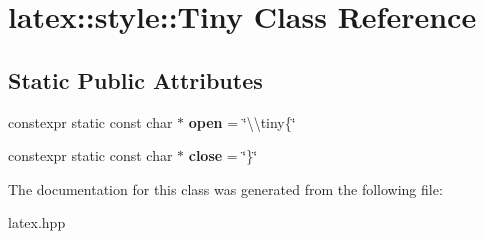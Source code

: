 \hypertarget{classlatex_1_1style_1_1Tiny}{\section{latex\-:\-:style\-:\-:Tiny Class Reference}
\label{classlatex_1_1style_1_1Tiny}
}
\subsection*{Static Public Attributes}
\begin{DoxyCompactItemize}
\item 
\hypertarget{classlatex_1_1style_1_1Tiny_a481c1c48ea808719f2b7386b9f9b2d1b}{constexpr static const char $\ast$ {\bfseries open} = \char`\"{}\textbackslash{}\textbackslash{}tiny\{\char`\"{}}\label{classlatex_1_1style_1_1Tiny_a481c1c48ea808719f2b7386b9f9b2d1b}

\item 
\hypertarget{classlatex_1_1style_1_1Tiny_a66ff1e8ca71e6c41a5d614765ffa52f2}{constexpr static const char $\ast$ {\bfseries close} = \char`\"{}\}\char`\"{}}\label{classlatex_1_1style_1_1Tiny_a66ff1e8ca71e6c41a5d614765ffa52f2}

\end{DoxyCompactItemize}


The documentation for this class was generated from the following file\-:\begin{DoxyCompactItemize}
\item 
latex.\-hpp\end{DoxyCompactItemize}

